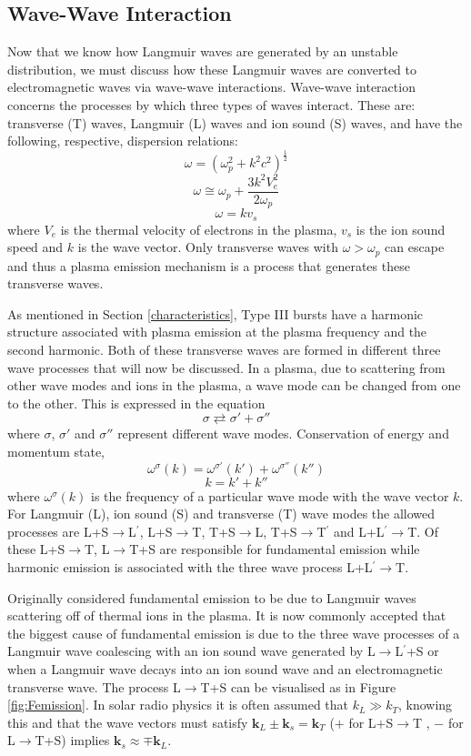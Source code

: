 \subsection{Wave-Wave Interaction}\label{Plasma Emission}
Now that we know how Langmuir waves are generated by an unstable distribution, we must discuss how these Langmuir waves are converted to electromagnetic waves via wave-wave interactions. Wave-wave interaction concerns the processes by which three types of waves interact. These are: transverse (T) waves, Langmuir (L) waves and ion sound (S) waves, and have the following, respective, dispersion relations:
$$ \omega=(\omega_p^2 +k^2c^2)^{\frac{1}{2}} $$
$$ \omega \cong \omega_p + \frac{3k^2V_e^2}{2 \omega_p}$$
$$ \omega = kv_s $$
where $V_e$ is the thermal velocity of electrons in the plasma, $v_s$ is the ion sound speed and $k$ is the wave vector. Only transverse waves with $\omega > \omega_p $ can escape and thus a plasma emission mechanism is a process that generates these transverse waves. 

As mentioned in Section \ref{characteristics}, Type III bursts have a harmonic structure associated with plasma emission at the plasma frequency and the second harmonic. Both of these transverse waves are formed in different three wave processes that will now be discussed.
In a plasma, due to scattering from other wave modes and ions in the plasma, a wave mode can be changed from one to the other. This is expressed in the equation 
$$ \sigma \rightleftarrows \sigma' + \sigma '' $$
where $\sigma$, $\sigma'$  and  $\sigma ''$ represent different wave modes. Conservation of energy and momentum state,
$$ \omega^{\sigma}(k)=\omega^{\sigma'}(k')+\omega^{\sigma''}(k'')$$
$$ k=k'+k''$$
where $ \omega^{\sigma}(k)$ is the frequency of a particular wave mode with the wave vector $k$. For Langmuir (L), ion sound (S) and transverse (T) wave modes the allowed processes are L+S$\rightarrow$L$^\prime$, L+S$\rightarrow$T,  T+S$\rightarrow$L,  T+S$\rightarrow$T$^\prime$ and  L+L$^\prime \rightarrow$T. Of these L+S$\rightarrow$T,  L$\rightarrow$T+S are responsible for fundamental emission while harmonic emission is associated with the three wave process L+L$^\prime \rightarrow$T.

Originally \cite{Ginzburg1958} considered fundamental emission to be due to Langmuir waves scattering off of thermal ions in the plasma. It is now commonly accepted that the biggest cause of fundamental emission is due to the three wave processes of a Langmuir wave coalescing with an ion sound wave generated by L$\rightarrow$L$^\prime$+S or when a Langmuir wave decays into an ion sound wave and an electromagnetic transverse wave. The process L$\rightarrow$T+S can be visualised as in Figure \ref{fig:Femission}. In solar radio physics it is often assumed that $k_L \gg k_T$, knowing this and that the wave vectors must satisfy $\mathbf{k}_L \pm \mathbf{k}_s = \mathbf{k}_T$ ($+$ for L+S$\rightarrow$T , $-$ for L$\rightarrow$T+S) implies $\mathbf{k}_s \approx \mp \mathbf{k}_L$.

